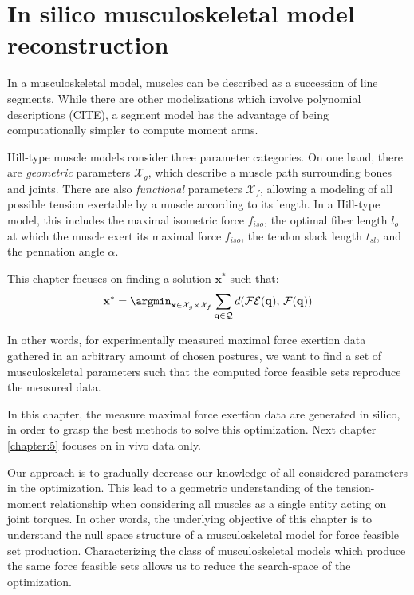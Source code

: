 
\chapter{In silico musculoskeletal model reconstruction}
\label{chapter:4_old}
In a musculoskeletal model, muscles can be described as a succession of line segments. While there are other modelizations which involve polynomial descriptions (CITE), a segment model has the advantage of being computationally simpler to compute moment arms.

Hill-type muscle models consider three parameter categories. On one hand, there are \emph{geometric} parameters $\mathcal{X}_g$, which describe a muscle path surrounding bones and joints. There are also \emph{functional} parameters $\mathcal{X}_f$, allowing a modeling of all possible tension exertable by a muscle according to its length. In a Hill-type model, this includes the maximal isometric force $f_{iso}$, the optimal fiber length $l_{o}$ at which the muscle exert its maximal force $f_{iso}$, the tendon slack length $t_{sl}$, and the pennation angle $\alpha$.

This chapter focuses on finding a solution $\mathbf{x}^*$ such that:
$$\mathbf{x}^* = \argmin_{\mathbf{x}\in \mathcal{X}_g\times \mathcal{X}_f} \sum_{\mathbf{q}\in \mathcal{Q}} d(\mathcal{FE}(\mathbf{q}),\,\mathcal{F}(\mathbf{q}))$$

In other words, for experimentally measured maximal force exertion data gathered in an arbitrary amount of chosen postures, we want to find a set of musculoskeletal parameters such that the computed force feasible sets reproduce the measured data.

In this chapter, the measure maximal force exertion data are generated in silico, in order to grasp the best methods to solve this optimization. Next chapter \ref{chapter:5} focuses on in vivo data only.

Our approach is to gradually decrease our knowledge of all considered parameters in the optimization. This lead to a geometric understanding of the tension-moment relationship when considering all muscles as a single entity acting on joint torques. In other words, the underlying objective of this chapter is to understand the null space structure of a musculoskeletal model for force feasible set production. Characterizing the class of musculoskeletal models which produce the same force feasible sets allows us to reduce the search-space of the optimization.

